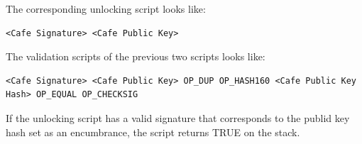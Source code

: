 \documentclass[a4paper, 12pt]{article}
\begin{document}
The corresponding unlocking script looks like:
\begin{lstlisting}[basicstyle=\ttfamily]
<Cafe Signature> <Cafe Public Key>
\end{lstlisting}

The validation scripts of the previous two scripts looks like:
\begin{lstlisting}[basicstyle=\ttfamily]
<Cafe Signature> <Cafe Public Key> OP_DUP OP_HASH160 <Cafe Public Key Hash> OP_EQUAL OP_CHECKSIG
\end{lstlisting}

If the unlocking script has a valid signature that corresponds to the publid key hash set as an encumbrance, the script returns TRUE on the stack. \cite{book:1317587}




	
 
\end{document}
